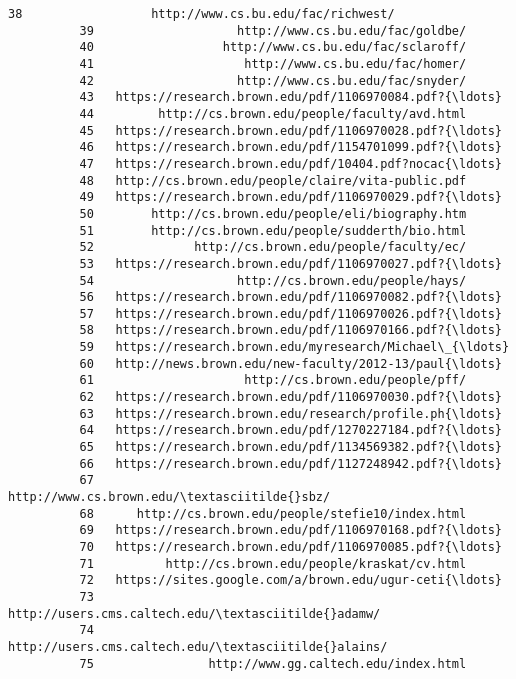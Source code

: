 \documentclass[11pt]{article}
\begin{document}
\begin{Verbatim}[commandchars=\\\{\}]
          38                  http://www.cs.bu.edu/fac/richwest/   
          39                    http://www.cs.bu.edu/fac/goldbe/   
          40                  http://www.cs.bu.edu/fac/sclaroff/   
          41                     http://www.cs.bu.edu/fac/homer/   
          42                    http://www.cs.bu.edu/fac/snyder/   
          43   https://research.brown.edu/pdf/1106970084.pdf?{\ldots}   
          44         http://cs.brown.edu/people/faculty/avd.html   
          45   https://research.brown.edu/pdf/1106970028.pdf?{\ldots}   
          46   https://research.brown.edu/pdf/1154701099.pdf?{\ldots}   
          47   https://research.brown.edu/pdf/10404.pdf?nocac{\ldots}   
          48   http://cs.brown.edu/people/claire/vita-public.pdf   
          49   https://research.brown.edu/pdf/1106970029.pdf?{\ldots}   
          50        http://cs.brown.edu/people/eli/biography.htm   
          51        http://cs.brown.edu/people/sudderth/bio.html   
          52              http://cs.brown.edu/people/faculty/ec/   
          53   https://research.brown.edu/pdf/1106970027.pdf?{\ldots}   
          54                    http://cs.brown.edu/people/hays/   
          56   https://research.brown.edu/pdf/1106970082.pdf?{\ldots}   
          57   https://research.brown.edu/pdf/1106970026.pdf?{\ldots}   
          58   https://research.brown.edu/pdf/1106970166.pdf?{\ldots}   
          59   https://research.brown.edu/myresearch/Michael\_{\ldots}   
          60   http://news.brown.edu/new-faculty/2012-13/paul{\ldots}   
          61                     http://cs.brown.edu/people/pff/   
          62   https://research.brown.edu/pdf/1106970030.pdf?{\ldots}   
          63   https://research.brown.edu/research/profile.ph{\ldots}   
          64   https://research.brown.edu/pdf/1270227184.pdf?{\ldots}   
          65   https://research.brown.edu/pdf/1134569382.pdf?{\ldots}   
          66   https://research.brown.edu/pdf/1127248942.pdf?{\ldots}   
          67                       http://www.cs.brown.edu/\textasciitilde{}sbz/   
          68      http://cs.brown.edu/people/stefie10/index.html   
          69   https://research.brown.edu/pdf/1106970168.pdf?{\ldots}   
          70   https://research.brown.edu/pdf/1106970085.pdf?{\ldots}   
          71          http://cs.brown.edu/people/kraskat/cv.html   
          72   https://sites.google.com/a/brown.edu/ugur-ceti{\ldots}   
          73                http://users.cms.caltech.edu/\textasciitilde{}adamw/   
          74               http://users.cms.caltech.edu/\textasciitilde{}alains/   
          75                http://www.gg.caltech.edu/index.html   

\end{Verbatim}
\end{document}
